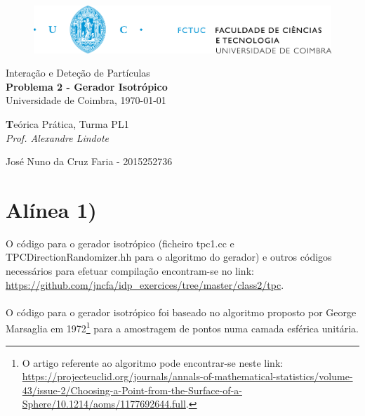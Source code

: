 \documentclass[a4paper, 12pt]{article} %
\def\classtitle{Interação e Deteção de Partículas}
\def\worktitle{Problema 2 - Gerador Isotrópico}
\def\profname{Alexandre Lindote}
\def\worklocal{Universidade de Coimbra}
\def\workdate{\today}
\def\authors{
	José Nuno da Cruz Faria - 2015252736
}
\def\classinfo{Teórica Prática, Turma PL1}
\begin{document}
	
	\begin{figure}[t] %
		\centering
		\includegraphics[width=0.85\linewidth]{uc_fctuc}
	\end{figure}

	\vspace*{0.05\textheight}	
	\begin{table}[!htbp]
		\centering
		
		{\Huge \classtitle}\\
		
		\vspace*{0.01\textheight}
		{\Large \textbf{\worktitle}}\\
		
		\vspace*{0.02\textheight}
		{\large {\worklocal, \workdate}}
		
	\end{table}
	
	\begin{table}[H]
		\begin{center}
			{\normalsize %
				\textbf\classinfo\\
				\emph{Prof. \profname}\\ 
				\vspace{0.0035\textheight}			
				\authors 
			}
		\end{center}
	\end{table}

	\section*{Alínea 1)}
	
	O código para o gerador isotrópico (ficheiro tpc1.cc e TPCDirectionRandomizer.hh para o algoritmo do gerador) e outros códigos necessários para efetuar compilação encontram-se no link: \url{https://github.com/jncfa/idp_exercices/tree/master/class2/tpc}.

	\paragraph{} O código para o gerador isotrópico foi baseado no algoritmo proposto por George Marsaglia em 1972\footnote{O artigo referente ao algoritmo pode encontrar-se neste link: \url{https://projecteuclid.org/journals/annals-of-mathematical-statistics/volume-43/issue-2/Choosing-a-Point-from-the-Surface-of-a-Sphere/10.1214/aoms/1177692644.full}.} para a amostragem de pontos numa camada esférica unitária. 
\end{document}
